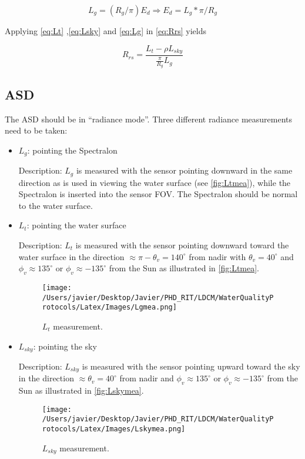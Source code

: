 \documentclass[]{spie}  %
\begin{document}
\begin{equation}\label{eq:Lg}
	L_g = (R_g/\pi)E_d\Rightarrow E_d = L_g*\pi/R_g
\end{equation}

Applying \autoref{eq:Lt} ,\autoref{eq:Lsky} and \autoref{eq:Lg} in \autoref{eq:Rrs} yields

\begin{equation}
	R_{rs} = \frac{L_t-\rho L_{sky}}{\frac{\displaystyle \pi}{\displaystyle R_g}L_g}
\end{equation}

\subsection{ASD}

The ASD should be in ``radiance mode''. Three different radiance measurements need to be taken:
\begin{itemize}
	\item $L_g$: pointing the Spectralon

Description: $L_g$ is measured with the sensor pointing downward in the same direction as is used in viewing the water surface (see \autoref{fig:Ltmea}), while the Spectralon is inserted into the sensor FOV. The Spectralon should be normal to the water surface.

	\item $L_t$: pointing the water surface

Description: $L_t$ is measured with the sensor pointing downward toward the water surface in the direction $\approx \pi-\theta_v = 140^\circ$ from nadir with $\theta_v = 40^\circ$ and $\phi_v \approx 135^\circ$ or $\phi_v \approx -135^\circ$ from the Sun as illustrated in \autoref{fig:Ltmea}.

\begin{figure}[h]
\centering
    \texttt{[image: /Users/javier/Desktop/Javier/PHD\_RIT/LDCM/WaterQualityProtocols/Latex/Images/Lgmea.png]}
    \vspace{0.5cm}
   \caption[]{\label{fig:Ltmea} $L_t$ measurement.}
\end{figure}

	\item $L_{sky}$: pointing the sky

Description: $L_{sky}$ is measured with the sensor pointing upward toward the sky in the direction $\approx \theta_v = 40^\circ$ from nadir and $\phi_v \approx 135^\circ$ or $\phi_v \approx -135^\circ$ from the Sun as illustrated in \autoref{fig:Lskymea}.

\begin{figure}[h]
\centering
    \texttt{[image: /Users/javier/Desktop/Javier/PHD\_RIT/LDCM/WaterQualityProtocols/Latex/Images/Lskymea.png]}
    \vspace{0.5cm}
   \caption[]{\label{fig:Lskymea} $L_{sky}$ measurement.}
\end{figure}

\end{itemize}
\end{document}
